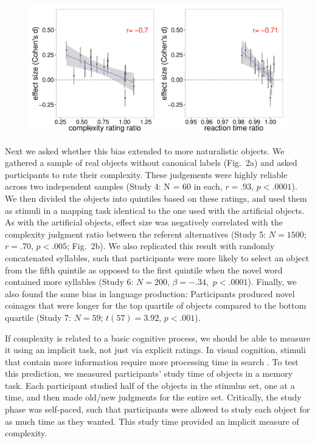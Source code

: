\documentclass[12pt]{article}
\begin{document}
\begin{figure}[t]
\begin{center}
\includegraphics[scale = .5]{figs/realobjs.pdf}
\caption{}
\end{center}
\label{fig:real_objs}
\end{figure}

Next we asked whether this bias extended to more naturalistic objects. We gathered a sample of real objects without canonical labels (Fig.\ 2a) and asked participants to rate their complexity. These judgements were highly reliable across two independent samples (Study 4: N = 60 in each, $r = .93$, $p < .0001$). We then divided the objects into quintiles based on these ratings, and used them as stimuli in a mapping task identical to the one used with the artificial objects. As with the artificial objects, effect size was negatively correlated with the complexity judgment ratio between the referent alternatives (Study 5: $N = 1500$; $r = .70$, $p < .005$; Fig.\ 2b). We also replicated this result with randomly concatenated syllables, such that participants were more likely to select an object from the fifth quintile as opposed to the first quintile when the novel word contained more syllables (Study 6: $N=200$, $\beta=-.34,$ $p <.0001$). Finally, we  also found the same bias in language production: Participants produced novel coinages that were longer for the top quartile of objects compared to the bottom quartile (Study 7: $N=59$; $t(57) = 3.92$, $p < .001$). 
					
If complexity is related to a basic cognitive process, we should be able to measure it using an implicit task, not just via explicit ratings. In visual cognition, stimuli that contain more information require more processing time in search \cite{alvarez2004capacity, hyman}. To test this prediction, we measured participants' study time of objects in a memory task. Each participant studied half of the objects in the stimulus set, one at a time, and then made old/new judgments for the entire set. Critically, the study phase was self-paced, such that participants were allowed to study each object for as much time as they wanted. This study time provided an implicit measure of complexity.
					
\end{document}
